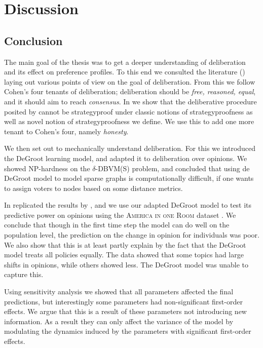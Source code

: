 \newpage
\chapter{Discussion}
\label{Discussion}

\section{Conclusion}

The main goal of the thesis was to get a deeper understanding of deliberation
and its effect on preference profiles. To this end we consulted the literature
() laying out various points of view on the goal of
deliberation. From this we follow Cohen's
\cite{cohenDeliberationDemocraticLegimitimacy2002} four tenants of
deliberation; deliberation should be \textit{free, reasoned, equal}, and  it
should aim to reach \textit{consensus}. In  we show that the
deliberative procedure posited by
\citet{radDeliberationSinglePeakednessCoherent2021} cannot be strategyproof
under classic notions of strategyproofness as well as novel notion of
strategyproofness we define. We use this to add one more tenant to Cohen's four,
namely \textit{honesty}.

We then set out to mechanically understand deliberation. For this we introduced
the DeGroot learning model, and adapted it to deliberation over opinions. We showed
NP-hardness on the $\delta$-DBVM(S) problem, and concluded that using de DeGroot model
to model sparse graphs is computationally difficult, if one wants to assign voters to nodes
based on some distance metrics.

In  replicated the results by
\citet{radDeliberationSinglePeakednessCoherent2021}, and we use our adapted
DeGroot model to test its predictive power on opinions using the
\textsc{America in one Room} dataset \cite{fishkinCanDeliberationHave2024}. We
conclude that though in the first time step the model can do well on the
population level, the prediction on the change in opinion for individuals was
poor. We also show that this is at least partly explain by the fact that the
DeGroot model treats all policies equally. The data showed that some topics had
large shifts in opinions, while others showed less. The DeGroot model was
unable to capture this.

Using sensitivity analysis we showed that all parameters affected the final
predictions, but interestingly some parameters had non-significant first-order
effects. We argue that this is a result of these parameters not introducing new
information. As a result they can only affect the variance of the model by
modulating the dynamics induced by the parameters with significant first-order
effects.

